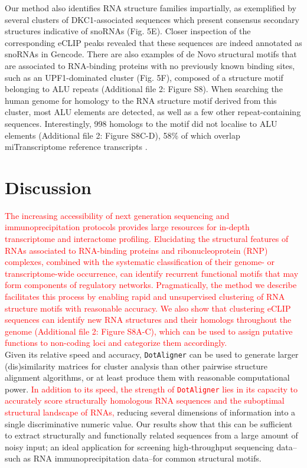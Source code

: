 \documentclass{bmcart}
\newcommand\dotaligner{\texttt{DotAligner}}
\begin{document}
Our method also identifies RNA structure families impartially, 
as exemplified by several clusters of DKC1-associated sequences which present
consensus secondary structures indicative of snoRNAs (Fig. 5E). 
Closer inspection of the corresponding eCLIP peaks revealed that these sequences
are indeed annotated as snoRNAs in Gencode. There are also examples of de Novo 
structural motifs that are associated to RNA-binding proteins with no 
previously known binding sites, such as an UPF1-dominated cluster 
(Fig. 5F), composed of a structure motif belonging to ALU repeats 
(Additional file 2: Figure S8). When searching the human genome for 
homology to the RNA structure motif derived from this cluster, 
most ALU elements are detected, as well as a few other repeat-containing sequences. 
Interestingly, 998 homologs to the motif did not localise to ALU elements (Additional file 2: Figure S8C-D), 
58\% of which overlap miTranscriptome reference transcripts \cite{iyer2015landscape}. \\ 


\section*{Discussion}

\textcolor{red} { 
The increasing accessibility of next generation sequencing and immunoprecipitation 
protocols provides large resources for in-depth transcriptome and interactome profiling. 
Elucidating the structural features of RNAs associated to RNA-binding proteins and
ribonucleoprotein (RNP) complexes, combined with the systematic classification of
their genome- or transcriptome-wide occurrence, can identify recurrent functional motifs 
that may form components of regulatory networks.  Pragmatically, the method we describe  
facilitates this process by enabling rapid and unsupervised clustering of RNA structure motifs 
with reasonable accuracy. We also show that clustering eCLIP sequences can identify new
RNA structures and their homologs throughout the genome (Additional file 2: Figure S8A-C), which can be used to assign putative functions to non-coding loci and categorize them accordingly. }\\

Given its relative speed and accuracy, \dotaligner{} can be used to generate
larger (dis)similarity matrices for cluster analysis than other pairwise
structure alignment algorithms, or at least produce them with reasonable
computational power. \textcolor{red}{In addition to its speed, the strength of \dotaligner{}
lies in its capacity to accurately score structurally homologous RNA sequences
and the suboptimal structural landscape of RNAs,}
 reducing several dimensions of information  into a single
discriminative numeric value. Our results show that this can be sufficient to
extract structurally and functionally related sequences from a large amount of
noisy input; an ideal application for screening high-throughput sequencing
data--such as RNA immunoprecipitation data--for common structural motifs.\\
\end{document}
